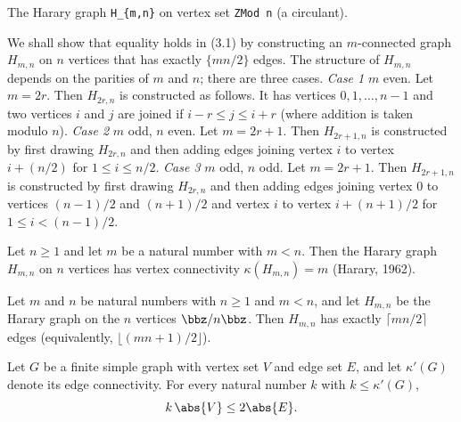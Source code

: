 \begin{definition}
\label{SimpleGraph.hararyGraph}
The Harary graph \texttt{H\_\{m,n\}} on vertex set \texttt{ZMod n} (a circulant).

We shall show that equality holds in (3.1) by constructing an $m$-connected graph
$H_{m,n}$ on $n$ vertices that has exactly $\{mn/2\}$ edges. The structure of $H_{m,n}$
depends on the parities of $m$ and $n$; there are three cases. \emph{Case 1} $m$ even.
Let $m = 2r$. Then $H_{2r,n}$ is constructed as follows. It has vertices $0, 1, \ldots,
n-1$ and two vertices $i$ and $j$ are joined if $i - r \leq j \leq i + r$ (where
addition is taken modulo $n$). \emph{Case 2} $m$ odd, $n$ even. Let $m = 2r + 1$. Then
$H_{2r+1,n}$ is constructed by first drawing $H_{2r,n}$ and then adding edges joining
vertex $i$ to vertex $i + (n/2)$ for $1 \leq i \leq n/2$. \emph{Case 3} $m$ odd, $n$
odd. Let $m = 2r + 1$. Then $H_{2r+1,n}$ is constructed by first drawing $H_{2r,n}$ and
then adding edges joining vertex 0 to vertices $(n-1)/2$ and $(n+1)/2$ and vertex $i$ to
vertex $i+(n+1)/2$ for $1 \le i < (n-1)/2$.
\end{definition}

\begin{theorem}
\label{SimpleGraph.hararyGraph_isConnectivity}
Let $n \ge 1$ and let $m$ be a natural number with $m < n$. Then the Harary graph
$H_{m,n}$ on $n$ vertices has vertex connectivity $\kappa(H_{m,n}) = m$ (Harary, 1962).
\end{theorem}

\begin{theorem}
\label{SimpleGraph.hararyGraph_edgeCard}
Let $m$ and $n$ be natural numbers with $n \ge 1$ and $m < n$, and let $H_{m,n}$ be the
Harary graph on the $n$ vertices $\bbz/n\bbz$. Then $H_{m,n}$ has exactly $\lceil mn/2
\rceil$ edges (equivalently, $\lfloor (mn+1)/2 \rfloor$).
\end{theorem}

\begin{theorem}
\label{SimpleGraph.edgeCard_ge_of_kEdgeConnected}
\leanok
{}
Let $G$ be a finite simple graph with vertex set $V$ and edge set $E$, and let
$\kappa'(G)$ denote its edge connectivity. For every natural number $k$ with $k \le
\kappa'(G)$, \[ k\,\abs{V} \le 2\abs{E}. \]
\end{theorem}

